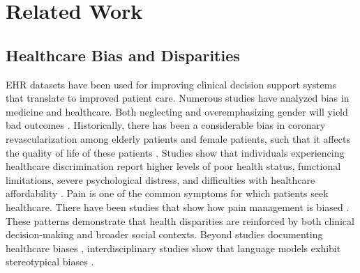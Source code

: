 
\section{Related Work}
\label{sec:related}
\subsection{Healthcare Bias and Disparities}
\label{subsec:healthcare_bias}
EHR datasets have been used for improving clinical decision support systems that translate to improved patient care. 
Numerous studies have analyzed bias in medicine and healthcare.
Both neglecting and overemphasizing gender will yield bad outcomes \citep{hambergGenderBiasMedicine2008,burnsReadabilityPatientDischarge2022}.
Historically, there has been a considerable bias in coronary revascularization among elderly patients and female patients, such that it affects the quality of life of these patients \citep{shawGenderAgeInequity2004}.
Studies show that individuals experiencing healthcare discrimination report higher levels of poor health status, functional limitations, severe psychological distress, and difficulties with healthcare affordability \citep{gonzalesComparisonHealthHealth2016,liuHealthStatusHealth2023a}.
Pain is one of the common symptoms for which patients seek healthcare. There have been studies that show how pain management is biased \citep{schwarzHowStereotypesAffect2019}.
These patterns demonstrate that health disparities are reinforced by both clinical decision-making and broader social contexts.
Beyond studies documenting healthcare biases \citep{burgessStereotypeThreatHealth2010,chaturvediLayDiagnosisHealthcareseeking1997,ayanianDifferencesUseProcedures1991,rowlandsMismatchPopulationHealth2015}, interdisciplinary studies show that language models exhibit stereotypical biases \citep{clusmannFutureLandscapeLarge2023,omarSociodemographicBiasesMedical2025,moellHarmReductionStrategies2025,huangEvaluationBiasAnalysis2025,sunshineEvaluatingQualityUnderstandability2025,vaidyaDemographicBiasMisdiagnosis2024,kimAssessingBiasesMedical2023,cauAddressingHiddenRisks2025}.
